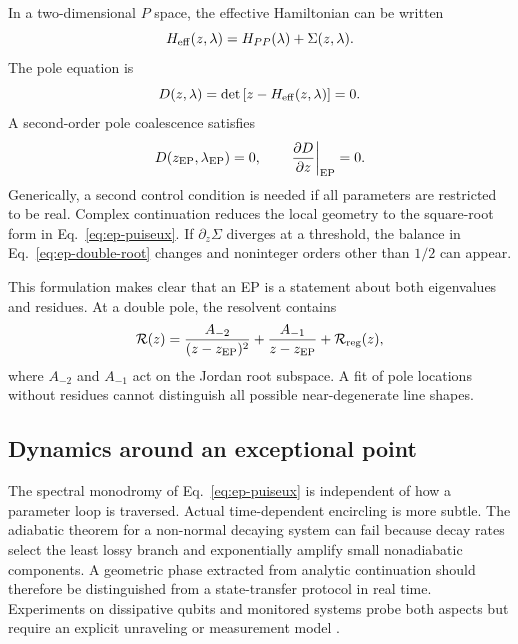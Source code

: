 In a two-dimensional $P$ space, the effective Hamiltonian can be written
\begin{equation}
  H_{\mathrm{eff}}(z,\lambda)
  =H_{PP}(\lambda)+\Sigma(z,\lambda) .
  \label{eq:ep-effective-H}
\end{equation}
The pole equation is
\begin{equation}
  D(z,\lambda)
  =\det\left[z-H_{\mathrm{eff}}(z,\lambda)\right]=0 .
  \label{eq:ep-determinant}
\end{equation}
A second-order pole coalescence satisfies
\begin{equation}
  D(z_{\mathrm{EP}},\lambda_{\mathrm{EP}})=0,
  \qquad
  \left.\frac{\partial D}{\partial z}\right|_{\mathrm{EP}}=0 .
  \label{eq:ep-double-root}
\end{equation}
Generically, a second control condition is needed if all parameters are
restricted to be real.  Complex continuation reduces the local geometry to
the square-root form in Eq.~\eqref{eq:ep-puiseux}.  If
$\partial_z\Sigma$ diverges at a threshold, the balance in
Eq.~\eqref{eq:ep-double-root} changes and noninteger orders other than $1/2$
can appear.

This formulation makes clear that an EP is a statement about both eigenvalues
and residues.  At a double pole, the resolvent contains
\begin{equation}
  \mathcal{R}(z)
  =\frac{A_{-2}}{(z-z_{\mathrm{EP}})^2}
  +\frac{A_{-1}}{z-z_{\mathrm{EP}}}
  +\mathcal{R}_{\mathrm{reg}}(z) ,
  \label{eq:ep-resolvent-laurent}
\end{equation}
where $A_{-2}$ and $A_{-1}$ act on the Jordan root subspace.  A fit of pole
locations without residues cannot distinguish all possible near-degenerate
line shapes.

\subsection{Dynamics around an exceptional point}
\label{subsec:ep-dynamics}

The spectral monodromy of Eq.~\eqref{eq:ep-puiseux} is independent of how a
parameter loop is traversed.  Actual time-dependent encircling is more subtle.
The adiabatic theorem for a non-normal decaying system can fail because decay
rates select the least lossy branch and exponentially amplify small
nonadiabatic components.  A geometric phase extracted from analytic
continuation should therefore be distinguished from a state-transfer protocol
in real time.  Experiments on dissipative qubits and monitored systems probe
both aspects but require an explicit unraveling or measurement model
\cite{Foroozani:2015jfz,Naghiloo:2019dqw,
Breuer2016NonMarkovian,Gneiting:2020pew}.
